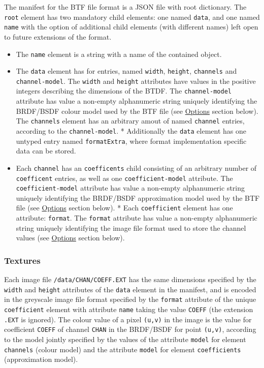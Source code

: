 The manifest for the BTF file format is a JSON file with root
dictionary. The \texttt{root} element has two mandatory child elements:
one named \texttt{data}, and one named \texttt{name} with the option of
additional child elements (with different names) left open to future
extensions of the format.
\begin{itemize}
\item The \texttt{name} element is a string with a
name of the contained object.
\item The \texttt{data} element has for
entries, named \texttt{width}, \texttt{height}, \texttt{channels} and
\texttt{channel-model}. The \texttt{width} and \texttt{height}
attributes have values in the positive integers describing the
dimensions of the BTDF. The \texttt{channel-model} attribute has value a
non-empty alphanumeric string uniquely identifying the BRDF/BSDF colour
model used by the BTF file (see \protect\hyperlink{Options}{Options}
section below). The \texttt{channels} element has an arbitrary amout of
named \texttt{channel} entries, according to the \texttt{channel-model}.
* Additionally the \texttt{data} element has one untyped entry named
\texttt{formatExtra}, where format implementation specific data can be
stored.
\item Each \texttt{channel} has an \texttt{coefficents} child
consisting of an arbitrary number of \texttt{coefficent} entries, as
well as one \texttt{coefficient-model} attribute. The
\texttt{coefficient-model} attribute has value a non-empty alphanumeric
string uniquely identifying the BRDF/BSDF approximation model used by
the BTF file (see \protect\hyperlink{Options}{Options} section below). *
Each \texttt{coefficient} element has one attribute: \texttt{format}.
The \texttt{format} attribute has value a non-empty alphanumeric string
uniquely identifying the image file format used to store the channel
values (see \protect\hyperlink{Options}{Options} section below).
\end{itemize}

\hypertarget{textures}{%
\subsubsection{Textures}\label{textures}}

Each image file \texttt{/data/CHAN/COEFF.EXT} has the same dimensions
specified by the \texttt{width} and \texttt{height} attributes of the
\texttt{data} element in the manifest, and is encoded in the greyscale
image file format specified by the \texttt{format} attribute of the
unique \texttt{coefficient} element with attribute \texttt{name} taking
the value \texttt{COEFF} (the extension \texttt{.EXT} is ignored). The
colour value of a pixel \texttt{(u,v)} in the image is the value for
coefficient \texttt{COEFF} of channel \texttt{CHAN} in the BRDF/BSDF for
point \texttt{(u,v)}, according to the model jointly specified by the
values of the attribute \texttt{model} for element \texttt{channels}
(colour model) and the attribute \texttt{model} for element
\texttt{coefficients} (approximation model).

